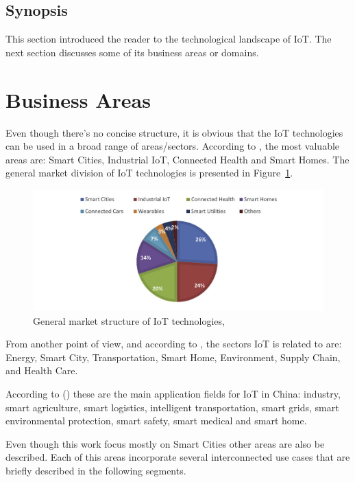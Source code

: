 \subsection{Synopsis}
\label{subsec:stateofart:synopsis}

This section introduced the reader to the technological landscape of \gls{IoT}. The next section discusses some of its business areas or domains.

\section{Business Areas}
\label{sec:stateofart:areas}

Even though there's no concise structure, it is obvious that the \gls{IoT} technologies can be used in a broad range of areas/sectors. According to \cite{nivzetic2019smart}, the most valuable areas are: Smart Cities, Industrial \gls{IoT}, Connected Health and Smart Homes. The general market division of IoT technologies is presented in Figure~\ref{fig:iot-areas}.

\begin{figure}[H]
    \centering
    \includegraphics[scale=0.5]{
        assets/figures/iot-areas.png
    }
    \caption[IoT market structure]{General market structure of IoT technologies, \cite{nivzetic2019smart}}
    \label{fig:iot-areas}
\end{figure}

From another point of view, and according to \cite{7073822}, the sectors \gls{IoT} is related to are: Energy, Smart City, Transportation, Smart Home, Environment, Supply Chain, and Health Care.

According to (\cite{6851114}) these are the main application fields for \gls{IoT} in China: industry, smart agriculture, smart logistics, intelligent transportation, smart grids, smart environmental protection, smart safety, smart medical and smart home.

Even though this work focus mostly on Smart Cities other areas are also be described. Each of this areas incorporate several interconnected use cases that are briefly described in the following segments.

